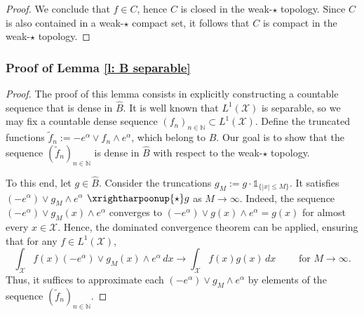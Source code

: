 \documentclass[a4paper, 11pt]{article}
\theoremstyle{definition}
\newcommand{\cX}{{\mathcal{X}}}
\newcommand{\theconvex}{C}
\newcommand{\indi}[1]{\mathds{1}_{#1}}
\begin{document}
{\begin{proof}
We conclude that \( f \in \theconvex \), hence \( \theconvex \) is closed in the weak-\(\star\) topology. Since \( \theconvex \) is also contained in a weak-\(\star\) compact set, it follows that \( \theconvex \) is compact in the weak-\(\star\) topology.
\end{proof}


\subsubsection{Proof of Lemma \ref{l: B separable}}
\begin{proof}
The proof of this lemma consists in explicitly constructing a countable sequence that is dense in \( \widehat{B} \). It is well known that \( L^1(\cX) \) is separable, so we may fix a countable dense sequence \( (f_n)_{n \in \mathbb{N}} \subset L^1(\cX) \). Define the truncated functions \( \tilde{f}_n := -e^\alpha \lor f_n \land e^\alpha \), which belong to \( \widehat{B} \). Our goal is to show that the sequence \( (\tilde{f}_n)_{n \in \mathbb{N}} \) is dense in \( \widehat{B} \) with respect to the weak-\(\star\) topology.

To this end, let \( g \in \widehat{B} \). Consider the truncations \( g_M := g \cdot \indi{\{|x| \le M\}} \). It satisfies $(-e^\alpha) \vee g_M \wedge e^\alpha$
$\xrightharpoonup{\star} g$  as \( M \to \infty \). Indeed, the sequence $(-e^\alpha)\vee g_M(x) \wedge e^\alpha$ converges to  $(-e^\alpha) \vee g(x) \wedge e^\alpha=g(x)$ for almost every $x \in \cX$.
Hence, the dominated convergence theorem can be applied, ensuring that for any \( f \in L^1(\mathcal{X}) \),
\[
\int_{\cX} f(x) (-e^\alpha)\vee g_M(x) \wedge e^\alpha \, dx \to \int_{\cX} f(x) g(x) \, dx \qquad \mbox{ for } M\rightarrow \infty.
\]
Thus, it suffices to approximate each \( (-e^\alpha )\vee g_M \wedge e^\alpha \) by elements of the sequence \( (\tilde{f}_n)_{n \in \mathbb{N}} \).


\end{proof}}
\end{document}
